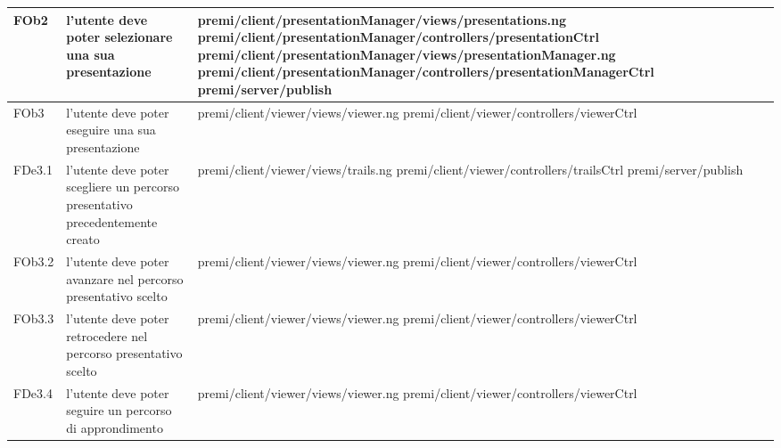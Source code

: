 \begin{longtable}{|l|p{5cm}|p{7cm}|}
\hline
FOb2 & l'utente deve poter selezionare una sua presentazione & \hspace{0pt}premi/client/presentationManager/views/presentations.ng \linebreak \linebreak premi/client/presentationManager/controllers/presentationCtrl \linebreak \linebreak premi/client/presentationManager/views/presentationManager.ng \linebreak \linebreak premi/client/presentationManager/controllers/presentationManagerCtrl \linebreak \linebreak premi/server/publish \\
\hline
FOb3 & l'utente deve poter eseguire una sua presentazione & \hspace{0pt}premi/client/viewer/views/viewer.ng \linebreak \linebreak premi/client/viewer/controllers/viewerCtrl \\
\hline
FDe3.1 & l'utente deve poter scegliere un percorso presentativo precedentemente creato & \hspace{0pt}premi/client/viewer/views/trails.ng \linebreak \linebreak premi/client/viewer/controllers/trailsCtrl \linebreak \linebreak premi/server/publish \\
\hline
FOb3.2 & l'utente deve poter avanzare nel percorso presentativo scelto & \hspace{0pt}premi/client/viewer/views/viewer.ng \linebreak \linebreak premi/client/viewer/controllers/viewerCtrl \\
\hline
FOb3.3 & l'utente deve poter retrocedere nel percorso presentativo scelto & \hspace{0pt}premi/client/viewer/views/viewer.ng \linebreak \linebreak premi/client/viewer/controllers/viewerCtrl \\
\hline
FDe3.4 & l'utente deve poter seguire un percorso di approndimento & \hspace{0pt}premi/client/viewer/views/viewer.ng \linebreak \linebreak premi/client/viewer/controllers/viewerCtrl \\

\end{longtable}
